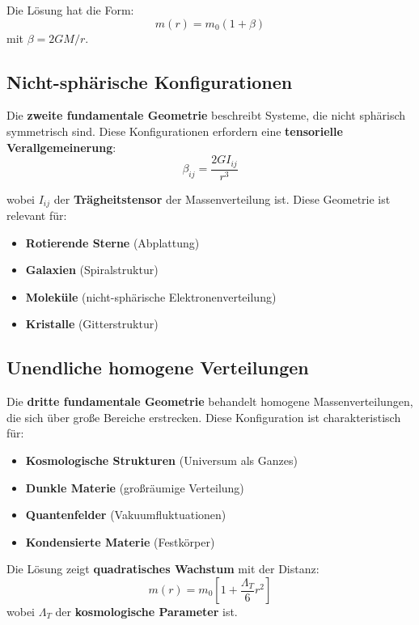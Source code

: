 \documentclass[12pt,a4paper]{report}
\begin{document}
	Die Lösung hat die Form:
	\begin{equation}
		m(r) = m_0(1 + \beta)
	\end{equation}
	mit $\beta = 2GM/r$.
	
	\subsection{Nicht-sphärische Konfigurationen}
	
	Die \textbf{zweite fundamentale Geometrie} beschreibt Systeme, die nicht sphärisch symmetrisch sind. Diese Konfigurationen erfordern eine \textbf{tensorielle Verallgemeinerung}:
	\begin{equation}
		\beta_{ij} = \frac{2G I_{ij}}{r^3}
	\end{equation}
	
	wobei $I_{ij}$ der \textbf{Trägheitstensor} der Massenverteilung ist. Diese Geometrie ist relevant für:
	\begin{itemize}
		\item \textbf{Rotierende Sterne} (Abplattung)
		\item \textbf{Galaxien} (Spiralstruktur)
		\item \textbf{Moleküle} (nicht-sphärische Elektronenverteilung)
		\item \textbf{Kristalle} (Gitterstruktur)
	\end{itemize}
	
	\subsection{Unendliche homogene Verteilungen}
	
	Die \textbf{dritte fundamentale Geometrie} behandelt homogene Massenverteilungen, die sich über große Bereiche erstrecken. Diese Konfiguration ist charakteristisch für:
	\begin{itemize}
		\item \textbf{Kosmologische Strukturen} (Universum als Ganzes)
		\item \textbf{Dunkle Materie} (großräumige Verteilung)
		\item \textbf{Quantenfelder} (Vakuumfluktuationen)
		\item \textbf{Kondensierte Materie} (Festkörper)
	\end{itemize}
	
	Die Lösung zeigt \textbf{quadratisches Wachstum} mit der Distanz:
	\begin{equation}
		m(r) = m_0\left[1 + \frac{\Lambda_T}{6}r^2\right]
	\end{equation}
	wobei $\Lambda_T$ der \textbf{kosmologische Parameter} ist.
	
\end{document}

